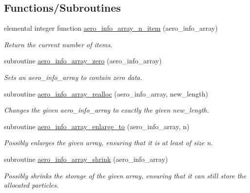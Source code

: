 \subsection*{Functions/\+Subroutines}
\begin{DoxyCompactItemize}
\item 
elemental integer function \mbox{\hyperlink{namespacepmc__aero__info__array_a0704e78a0bc96744d181384d88dff2ee}{aero\+\_\+info\+\_\+array\+\_\+n\+\_\+item}} (aero\+\_\+info\+\_\+array)
\begin{DoxyCompactList}\small\item\em Return the current number of items. \end{DoxyCompactList}\item 
subroutine \mbox{\hyperlink{namespacepmc__aero__info__array_aceb12e9f541f4df8ab3c5d4a37e75072}{aero\+\_\+info\+\_\+array\+\_\+zero}} (aero\+\_\+info\+\_\+array)
\begin{DoxyCompactList}\small\item\em Sets an aero\+\_\+info\+\_\+array to contain zero data. \end{DoxyCompactList}\item 
subroutine \mbox{\hyperlink{namespacepmc__aero__info__array_a4ce2e5c40bd09ddd7b86c03089bd828d}{aero\+\_\+info\+\_\+array\+\_\+realloc}} (aero\+\_\+info\+\_\+array, new\+\_\+length)
\begin{DoxyCompactList}\small\item\em Changes the given aero\+\_\+info\+\_\+array to exactly the given new\+\_\+length. \end{DoxyCompactList}\item 
subroutine \mbox{\hyperlink{namespacepmc__aero__info__array_a0ae4f267424b779e7b985ecda84ced0e}{aero\+\_\+info\+\_\+array\+\_\+enlarge\+\_\+to}} (aero\+\_\+info\+\_\+array, n)
\begin{DoxyCompactList}\small\item\em Possibly enlarges the given array, ensuring that it is at least of size n. \end{DoxyCompactList}\item 
subroutine \mbox{\hyperlink{namespacepmc__aero__info__array_a650cc8280450e226b94303abeeddaf6a}{aero\+\_\+info\+\_\+array\+\_\+shrink}} (aero\+\_\+info\+\_\+array)
\begin{DoxyCompactList}\small\item\em Possibly shrinks the storage of the given array, ensuring that it can still store the allocated particles. \end{DoxyCompactList}\item 

\end{DoxyCompactItemize}

